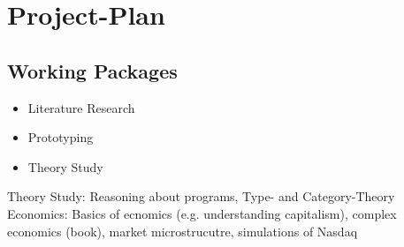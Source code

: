 \section{Project-Plan}

\subsection{Working Packages}

\begin{itemize}
\item Literature Research
\item Prototyping
\item Theory Study
\end{itemize}

Theory Study: Reasoning about programs, Type- and Category-Theory
Economics: Basics of ecnomics (e.g. understanding capitalism), complex economics (book), market microstrucutre, simulations of Nasdaq
